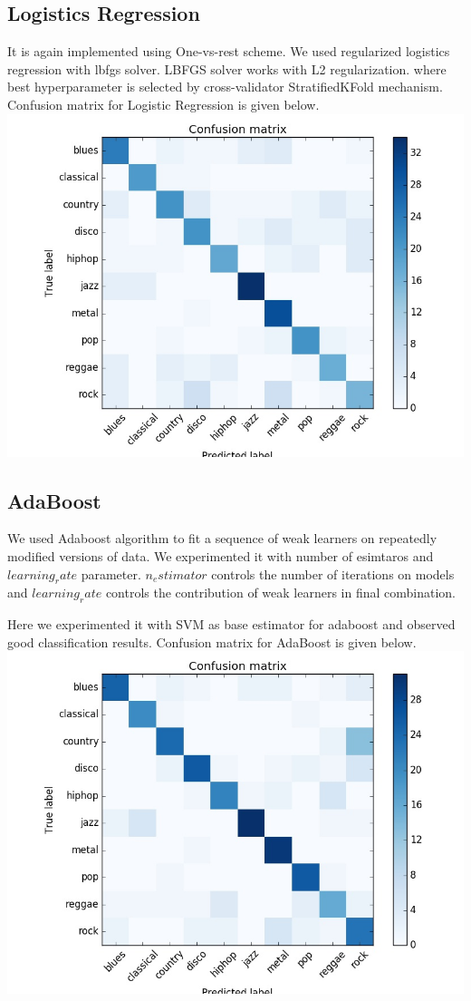 \documentclass[conference]{IEEEtran}
\begin{document}
\subsection{Logistics Regression}
\label{sec:Logistics Regression}
It is again implemented using One-vs-rest scheme. We used regularized logistics regression with lbfgs solver. LBFGS solver works with L2 regularization. where best hyperparameter is selected by cross-validator StratifiedKFold mechanism.
Confusion matrix for Logistic Regression is given below.
\includegraphics[width=\columnwidth]{LOGISTIC}


\subsection{AdaBoost}
\label{sub:AdaBoost Classification}
We used Adaboost algorithm to fit a sequence of weak learners on repeatedly modified versions of data. We experimented it with number of esimtaros and $learning_rate$ parameter. $n_estimator$ controls the number of iterations on models and $learning_rate$ controls the contribution of weak learners in final combination.

Here we experimented it with SVM as base estimator for adaboost and observed good classification results.
Confusion matrix for AdaBoost is given below.
\includegraphics[width=\columnwidth]{ADABOOST}
\end{document}
